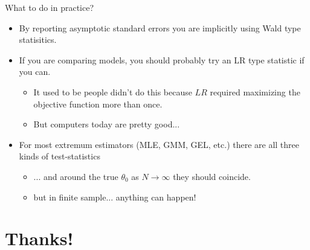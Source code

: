 \begin{frame}{What to do in practice?}
\begin{itemize}
\item By reporting asymptotic standard errors you are implicitly using \alert{Wald} type statisitics.
\item If you are comparing models, you should probably try an \alert{LR} type statistic if you can.
\begin{itemize}
\item It used to be people didn't do this because $LR$ required maximizing the objective function more than once.
\item But computers today are pretty good...
\end{itemize}
\item For most extremum estimators (MLE, GMM, GEL, etc.) there are all three kinds of test-statistics
\begin{itemize}
\item ... and around the true $\theta_0$ as $N\rightarrow \infty$ they should coincide.
\item but in finite sample... anything can happen!
\end{itemize}

\end{itemize}

\end{frame}
\section*{Thanks!}

